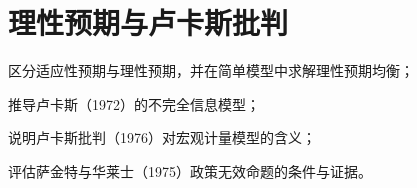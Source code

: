 \chapter{理性预期与卢卡斯批判}\label{ch:ratex}

\begin{chapterguide}
\begin{guidegoals}
\item 区分适应性预期与理性预期，并在简单模型中求解理性预期均衡；
\item 推导卢卡斯（1972）的不完全信息模型；
\item 说明卢卡斯批判（1976）对宏观计量模型的含义；
\item 评估萨金特与华莱士（1975）政策无效命题的条件与证据。
\end{guidegoals}
\end{chapterguide}

\chapterstub
